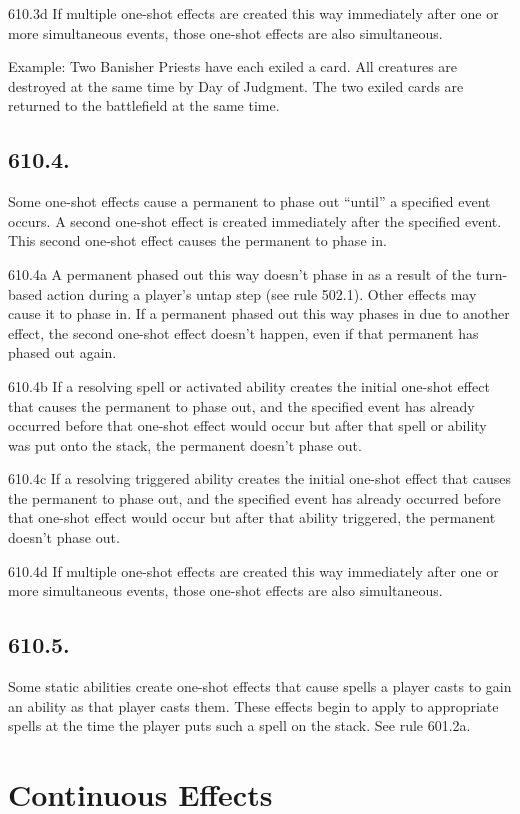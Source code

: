 610.3d If multiple one-shot effects are created this way immediately after one or more simultaneous events, those one-shot effects are also simultaneous.

Example: Two Banisher Priests have each exiled a card. All creatures are destroyed at the same time by Day of Judgment. The two exiled cards are returned to the battlefield at the same time.

\subsection*{610.4.}
Some one-shot effects cause a permanent to phase out “until” a specified event occurs. A second one-shot effect is created immediately after the specified event. This second one-shot effect causes the permanent to phase in.

610.4a A permanent phased out this way doesn’t phase in as a result of the turn-based action during a player’s untap step (see rule 502.1). Other effects may cause it to phase in. If a permanent phased out this way phases in due to another effect, the second one-shot effect doesn’t happen, even if that permanent has phased out again.

610.4b If a resolving spell or activated ability creates the initial one-shot effect that causes the permanent to phase out, and the specified event has already occurred before that one-shot effect would occur but after that spell or ability was put onto the stack, the permanent doesn’t phase out.

610.4c If a resolving triggered ability creates the initial one-shot effect that causes the permanent to phase out, and the specified event has already occurred before that one-shot effect would occur but after that ability triggered, the permanent doesn’t phase out.

610.4d If multiple one-shot effects are created this way immediately after one or more simultaneous events, those one-shot effects are also simultaneous.

\subsection*{610.5.}
Some static abilities create one-shot effects that cause spells a player casts to gain an ability as that player casts them. These effects begin to apply to appropriate spells at the time the player puts such a spell on the stack. See rule 601.2a.

\section{Continuous Effects}
